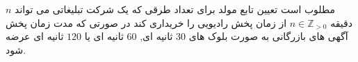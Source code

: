 \exercise
مطلوب است تعیین تابع مولد برای تعداد طرقی که یک شرکت تبلیغاتی می تواند 
$n$
دقیقه
$n\in \mathbb{Z}_{>0}$
از زمان پخش رادیویی را خریداری کند در صورتی که مدت زمان پخش آگهی های بازرگانی به صورت بلوک های
$30$
ثانیه ای, 
$60$
ثانیه ای یا
$120$
ثانیه ای عرضه شود.